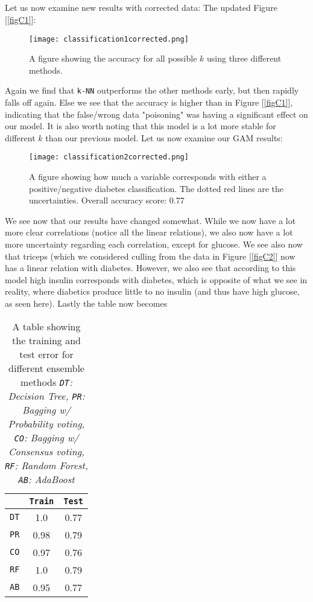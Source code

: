 \documentclass{article}
\begin{document}
\subsection{}
Let us now examine new results with corrected data:
\newline The updated Figure [\ref{figC1}]:
\begin{figure}[ht!]
    \centering
    \texttt{[image: classification1corrected.png]}
    \caption{A figure showing the accuracy for all possible $k$ using three different methods.}
    \label{figC3}
\end{figure} \newline
Again we find that \texttt{k-NN} outperforms the other methods early, but then rapidly falls off again. Else we see that the accuracy is higher than in Figure [\ref{figC1}], indicating that the false/wrong data "poisoning" was having a significant effect on our model. It is also worth noting that this model is a lot more stable for different $k$ than our previous model. 
\newpage Let us now examine our GAM results:
\begin{figure}[ht!]
    \centering
    \texttt{[image: classification2corrected.png]}
    \caption{A figure showing how much a variable corresponds with either a positive/negative diabetes classification. The dotted red lines are the uncertainties. Overall accuracy score: 0.77}
    \label{figC4}
\end{figure} \newline
We see now that our results have changed somewhat. While we now have a lot more clear correlations (notice all the linear relations), we also now have a lot more uncertainty regarding each correlation, except for  glucose. We see also now that triceps (which we considered culling from the data in Figure [\ref{figC2}] now has a linear relation with diabetes. However, we also see that according to this model high insulin corresponds with diabetes, which is opposite of what we see in reality, where diabetics produce little to no insulin (and thus have high glucose, as seen here).
\newline
Lastly the table now becomes
\begin{table}[ht!]
    \centering
    \begin{tabular}{c|c|c}
         & \texttt{Train} & \texttt{Test} \\
         \hline
         \texttt{DT}&  1.0& 0.77 \\
         \texttt{PR}& 0.98& 0.79 \\
         \texttt{CO}& 0.97& 0.76 \\
         \texttt{RF}& 1.0& 0.79 \\
         \texttt{AB}& 0.95& 0.77 \\
    \end{tabular}
    \caption{A table showing the training and test error for different ensemble methods \newline \textit{\texttt{DT}: Decision Tree, \texttt{PR}: Bagging w/ Probability voting, \texttt{CO}: Bagging w/ Consensus voting, \texttt{RF}: Random Forest, \texttt{AB}: AdaBoost}}
    \label{tabC1}
\end{table} \newline
\end{document}
